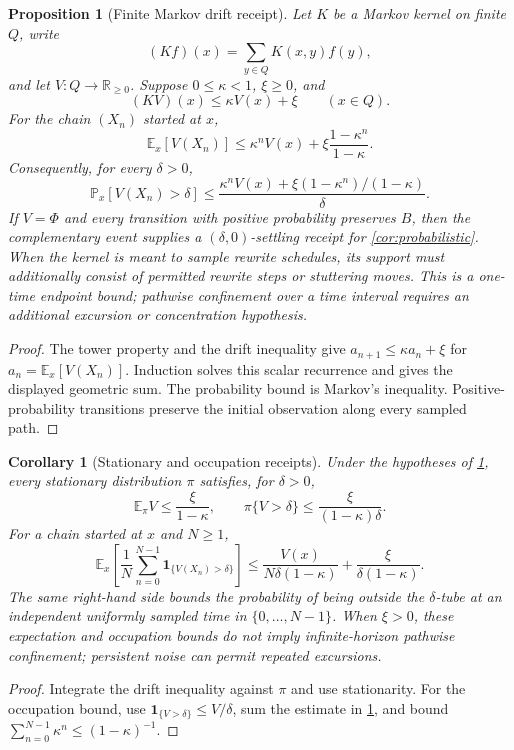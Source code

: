 \documentclass[11pt]{article}
\newtheorem{proposition}[theorem]{Proposition}
\newtheorem{corollary}[theorem]{Corollary}
\theoremstyle{definition}
\theoremstyle{remark}
\numberwithin{equation}{section}
\begin{document}
\begin{proposition}[Finite Markov drift receipt]\label{prop:markov-receipt}
Let $K$ be a Markov kernel on finite $Q$, write
\[
 (Kf)(x)=\sum_{y\in Q}K(x,y)f(y),
\]
and let $V:Q\to\mathbb R_{\ge0}$.  Suppose $0\le\kappa<1$,
$\xi\ge0$, and
\[
 (KV)(x)\le\kappa V(x)+\xi
 \qquad(x\in Q).
\]
For the chain $(X_n)$ started at $x$,
\[
 \mathbb E_x[V(X_n)]
 \le
 \kappa^nV(x)+
 \xi\frac{1-\kappa^n}{1-\kappa}.
\]
Consequently, for every $\delta>0$,
\[
 \mathbb P_x[V(X_n)>\delta]
 \le
 \frac{\kappa^nV(x)+
 \xi(1-\kappa^n)/(1-\kappa)}{\delta}.
\]
If $V=\Phi$ and every transition with positive probability preserves $B$,
then the complementary event supplies a $(\delta,0)$-settling receipt for
\cref{cor:probabilistic}.  When the kernel is meant to sample rewrite
schedules, its support must additionally consist of permitted rewrite steps
or stuttering moves.  This is a one-time endpoint bound; pathwise confinement
over a time interval requires an additional excursion or concentration
hypothesis.
\end{proposition}

\begin{proof}
The tower property and the drift inequality give
$a_{n+1}\le\kappa a_n+\xi$ for
$a_n=\mathbb E_x[V(X_n)]$.  Induction solves this scalar recurrence and
gives the displayed geometric sum.  The probability bound is Markov's
inequality.  Positive-probability transitions preserve the initial
observation along every sampled path.
\end{proof}

\begin{corollary}[Stationary and occupation receipts]
\label{cor:markov-occupation}
Under the hypotheses of \cref{prop:markov-receipt}, every stationary
distribution $\pi$ satisfies, for $\delta>0$,
\[
 \mathbb E_\pi V\le\frac{\xi}{1-\kappa},
 \qquad
 \pi\{V>\delta\}\le\frac{\xi}{(1-\kappa)\delta}.
\]
For a chain started at $x$ and $N\ge1$,
\[
 \mathbb E_x\!\left[\frac1N\sum_{n=0}^{N-1}
       \mathbf1_{\{V(X_n)>\delta\}}\right]
 \le
 \frac{V(x)}{N\delta(1-\kappa)}
 +\frac{\xi}{\delta(1-\kappa)}.
\]
The same right-hand side bounds the probability of being outside the
$\delta$-tube at an independent uniformly sampled time in
$\{0,\ldots,N-1\}$.  When $\xi>0$, these expectation and occupation bounds do
not imply infinite-horizon pathwise confinement; persistent noise can permit
repeated excursions.
\end{corollary}

\begin{proof}
Integrate the drift inequality against $\pi$ and use stationarity.  For the
occupation bound, use
$\mathbf1_{\{V>\delta\}}\le V/\delta$, sum the estimate in
\cref{prop:markov-receipt}, and bound
$\sum_{n=0}^{N-1}\kappa^n\le(1-\kappa)^{-1}$.
\end{proof}
\end{document}
